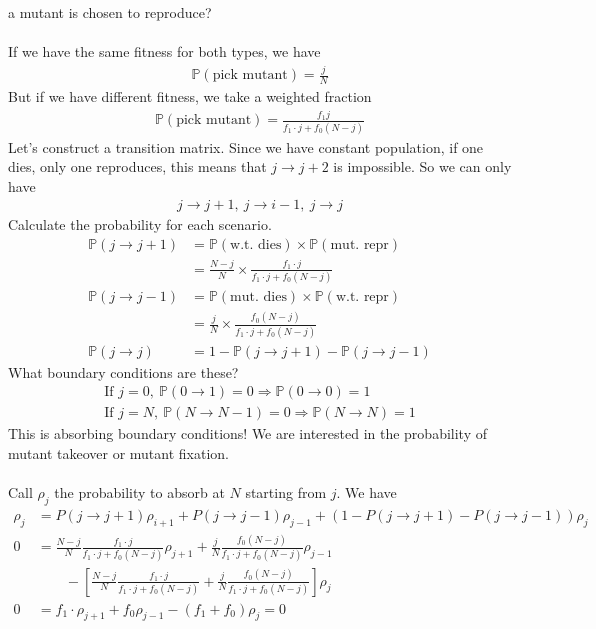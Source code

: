 \documentclass[12pt, letterpaper]{article}
\begin{document}
a mutant is chosen to reproduce? \\ \\
If we have the same fitness for both types, we have 
\begin{align*}
    \mathbb{P}(\text{pick mutant}) = \frac{j}{N}
\end{align*}
But if we have different fitness, we take a weighted fraction 
\begin{align*}
    \mathbb{P}(\text{pick mutant}) = \frac{f_1 j}{f_1\cdot j + f_0 (N-j)}
\end{align*}
Let's construct a transition matrix. Since we have constant population, if one dies, only one 
reproduces, this means that $j \rightarrow j+2$ is impossible. So we can only have
\begin{align*}
    j\rightarrow j+1,\ j\rightarrow i-1,\ j\rightarrow j
\end{align*}
Calculate the probability for each scenario.
\begin{align*}
    \mathbb{P} (j\rightarrow j+1) &= \mathbb{P}(\text{w.t. dies})\times \mathbb{P}(\text{mut. repr}) \\
    &= \frac{N-j}{N} \times \frac{f_1 \cdot j}{f_1\cdot j + f_0(N-j)} \\
    \mathbb{P}(j \rightarrow j-1) &= \mathbb{P}(\text{mut. dies})\times \mathbb{P}(\text{w.t. repr}) \\
    &= \frac{j}{N} \times \frac{f_0(N-j)}{f_1\cdot j + f_0 (N-j)} \\
    \mathbb{P}(j \rightarrow j)   &= 1 - \mathbb{P}(j \rightarrow j+1) - \mathbb{P}(j\rightarrow j-1)
\end{align*}
What boundary conditions are these?
\begin{align*}
    \text{If } j = 0,\ \mathbb{P}(0\rightarrow 1) = 0 \Rightarrow \mathbb{P}(0\rightarrow 0) = 1 \\
    \text{If } j = N,\ \mathbb{P}(N\rightarrow N-1) = 0 \Rightarrow \mathbb{P}(N\rightarrow N) = 1
\end{align*}
This is absorbing boundary conditions! We are interested in the probability of mutant takeover 
or mutant fixation. \\ \\
Call $\rho_j$ the probability to absorb at $N$ starting from $j$. We have
\begin{align*}
    \rho_j &= P(j\rightarrow j+1)\rho_{i+1} + P(j \rightarrow j-1)\rho_{j-1} + (1-P(j\rightarrow j+1) - P(j\rightarrow j-1))\rho_j \\
    0 &= \frac{N-j}{N}\frac{f_1\cdot j}{f_1\cdot j + f_0(N-j)}\rho_{j+1} + \frac{j}{N}\frac{f_0(N-j)}{f_1\cdot j + f_0(N-j)}\rho_{j-1} \\
    &\qquad - \left[\frac{N-j}{N}\frac{f_1\cdot j}{f_1\cdot j + f_0(N-j)} + \frac{j}{N}\frac{f_0(N-j)}{f_1\cdot j + f_0(N-j)}\right]\rho_j \\
    0 &= f_1\cdot \rho_{j+1} + f_0 \rho_{j-1} - (f_1+f_0)\rho_j = 0  
\end{align*}
\end{document}
